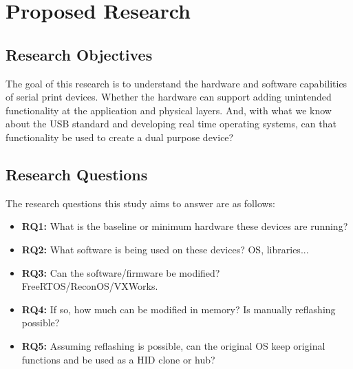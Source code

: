 \chapter{\leavevmode Proposed Research}
\label{chap:proposedresearch}



\section{Research Objectives }  \label{researchobjectives}

The goal of this research is to understand the hardware and software capabilities of serial print devices. Whether the hardware can support adding unintended functionality at the application and physical layers. And, with what we know about the USB standard and developing real time operating systems, can that functionality be used to create a dual purpose device?


\section{Research Questions}  \label{researchquestions}

The research questions this study aims to answer are as follows:

\begin{itemize}
  \item \textbf{RQ1:} What is the baseline or minimum hardware these devices are running?
  \item \textbf{RQ2:} What software is being used on these devices? OS, libraries...
  \item \textbf{RQ3:} Can the software/firmware be modified? FreeRTOS/ReconOS/VXWorks.
  \item \textbf{RQ4:} If so, how much can be modified in memory? Is manually reflashing possible?
  \item \textbf{RQ5:} Assuming reflashing is possible, can the original OS keep original functions and be used as a HID clone or hub?
\end{itemize}


